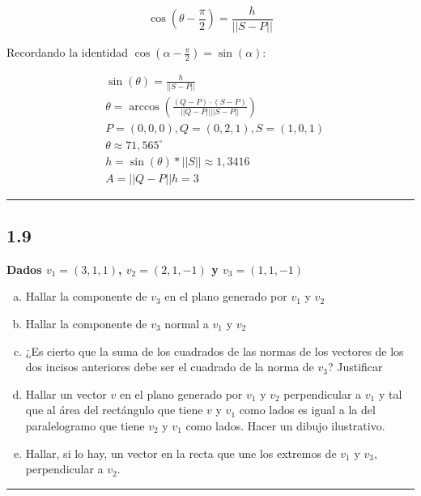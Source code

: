 \documentclass{article}
\begin{document}
\begin{equation}
\cos \left( \theta - \frac{\pi}{2} \right) = \frac{h}{||S-P||}
\end{equation}

Recordando la identidad $\cos(\alpha - \frac{\pi}{2}) = \sin(\alpha)$:

\begin{subequations}
\begin{align}
& \sin(\theta) = \frac{h}{||S-P||} \\
& \theta = \arccos \left( \frac{(Q-P) \cdot (S-P)}{||Q-P|| ||S-P||} \right) \\
& P = (0,0,0), Q = (0,2,1), S = (1, 0, 1) \\
& \theta \approx 71,565^{\circ} \\
& h = \sin(\theta) * ||S|| \approx 1,3416 \\
& A = ||Q-P|| h = 3
\end{align}
\end{subequations}

\hrule
\vspace{10 pt}

\subsection*{1.9}
\label{subsec:1.9}

\textbf{Dados $v_1 = (3, 1, 1)$, $v_2 = (2, 1, -1)$ y $v_3 = (1, 1, -1)$}

\begin{enumerate}[(a)]
\bfseries
\item Hallar la componente de $v_3$ en el plano generado por $v_1$ y $v_2$

\item Hallar la componente de $v_3$ normal a $v_1$ y $v_2$

\item ¿Es cierto que la suma de los cuadrados de las normas de los vectores de los dos incisos anteriores debe ser el cuadrado de la norma de $v_3$? Justificar

\item Hallar un vector $v$ en el plano generado por $v_1$ y $v_2$ perpendicular a $v_1$ y tal que al área del rectángulo que tiene $v$ y $v_1$ como lados es igual a la del paralelogramo que tiene $v_2$ y $v_1$ como lados. Hacer un dibujo ilustrativo.

\item Hallar, si lo hay, un vector en la recta que une los extremos de $v_1$ y $v_3$, perpendicular a $v_2$. 
\end{enumerate}
\hrule
\end{document}
